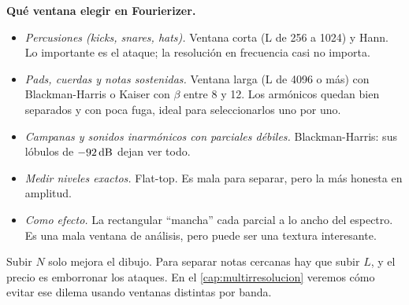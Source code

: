 \begin{estudio}
\textbf{Qué ventana elegir en Fourierizer.}
\begin{itemize}
  \item \emph{Percusiones (kicks, snares, hats).} Ventana corta (L de 256 a 1024) y Hann. Lo
        importante es el ataque; la resolución en frecuencia casi no importa.
  \item \emph{Pads, cuerdas y notas sostenidas.} Ventana larga (L de 4096 o más) con
        Blackman-Harris o Kaiser con $\beta$ entre 8 y 12. Los armónicos quedan bien separados y
        con poca fuga, ideal para seleccionarlos uno por uno.
  \item \emph{Campanas y sonidos inarmónicos con parciales débiles.} Blackman-Harris: sus lóbulos
        de $-92\,\mathrm{dB}$ dejan ver todo.
  \item \emph{Medir niveles exactos.} Flat-top. Es mala para separar, pero la más honesta en
        amplitud.
  \item \emph{Como efecto.} La rectangular ``mancha'' cada parcial a lo ancho del espectro. Es
        una mala ventana de análisis, pero puede ser una textura interesante.
\end{itemize}
Subir $N$ solo mejora el dibujo. Para separar notas cercanas hay que subir $L$, y el precio es
emborronar los ataques. En el \cref{cap:multirresolucion} veremos cómo evitar ese dilema usando
ventanas distintas por banda.
\end{estudio}
